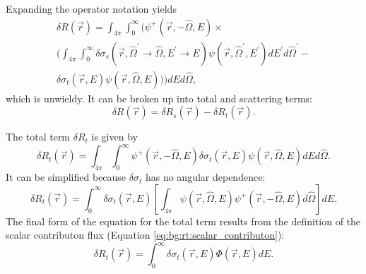 Expanding the operator notation yields
\begin{multline}\label{eq:dr:dr_function_of_position_expanded}
  \delta R\left(\vec{r}\right) =
  \int_{4\pi}\int_0^\infty\Biggl(\psi^+\left(\vec{r},-\hat{\Omega},E\right) \times \\
  \Biggl(\int_{4\pi}\int_0^\infty\delta\sigma_s\left(\vec{r},\hat{\Omega}^\prime\rightarrow\hat{\Omega},E^\prime\rightarrow E\right)\psi\left(\vec{r},\hat{\Omega}^\prime,E^\prime\right)dE^\prime d\hat{\Omega}^\prime - \\
  \delta\sigma_t\left(\vec{r},E\right)\psi\left(\vec{r},\hat{\Omega},E\right)\Biggr)\Biggr)dEd\hat{\Omega},
\end{multline}
which is unwieldy.
It can be broken up into total and scattering terms:
\begin{equation}\label{eq:dr:dr_terms}
  \delta R\left(\vec{r}\right) =
  \delta R_s\left(\vec{r}\right) -
  \delta R_t\left(\vec{r}\right).
\end{equation}

The total term $\delta R_t$ is given by
\begin{equation}\label{eq:dr:dr_total_term_1}
  \delta R_t\left(\vec{r}\right) =
  \int_{4\pi}\int_0^\infty\psi^+\left(\vec{r},-\hat{\Omega},E\right)\delta\sigma_t\left(\vec{r},E\right)\psi\left(\vec{r},\hat{\Omega},E\right)dEd\hat{\Omega}.
\end{equation}
It can be simplified because $\delta\sigma_t$ has no angular dependence:
\begin{equation}\label{eq:dr:dr_total_term_2}
  \delta R_t\left(\vec{r}\right) =
  \int_0^\infty\delta\sigma_t\left(\vec{r},E\right)\left[\int_{4\pi}\psi\left(\vec{r},\hat{\Omega},E\right)\psi^+\left(\vec{r},-\hat{\Omega},E\right)d\hat{\Omega}\right]dE.
\end{equation}
The final form of the equation for the total term results from the definition of the scalar contributon flux (Equation \ref{eq:bg:rt:scalar_contributon}):
\begin{equation}\label{eq:dr:dr_total_term}
  \delta R_t\left(\vec{r}\right) =
  \int_0^\infty\delta\sigma_t\left(\vec{r},E\right)\Phi\left(\vec{r},E\right)dE.
\end{equation}

